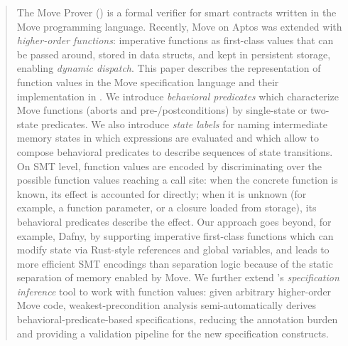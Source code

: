\begin{abstract}
	The Move Prover (\MVP) is a formal verifier for smart contracts written in the Move programming language.
	Recently, Move on Aptos was extended with \emph{higher-order functions}: imperative functions as first-class values that can be passed around, stored in data structs, and kept in persistent storage, enabling \emph{dynamic dispatch}.
	This paper describes the representation of function values in the Move specification language and their implementation in \MVP.
	We introduce \emph{behavioral predicates} which characterize Move functions (aborts and pre-/postconditions) by single-state or two-state predicates.
	We also introduce \emph{state labels} for naming intermediate memory states in which expressions are evaluated and which allow to compose behavioral predicates to describe sequences of state transitions.
	On SMT level, function values are encoded by discriminating over the possible function values reaching a call site: when the concrete function is known, its effect is accounted for directly; when it is unknown (for example, a function parameter, or a closure loaded from storage), its behavioral predicates describe the effect.
    Our approach goes beyond, for example, Dafny, by supporting imperative first-class functions which can modify state via Rust-style references and global variables, and leads to more efficient SMT encodings than separation logic because of the static separation of memory enabled by Move.
	We further extend \MVP's \emph{specification inference} tool to work with function values: given arbitrary higher-order Move code, weakest-precondition analysis semi-automatically derives behavioral-predicate-based specifications, reducing the annotation burden and providing a validation pipeline for the new specification constructs.
\end{abstract}







\newpage



%



